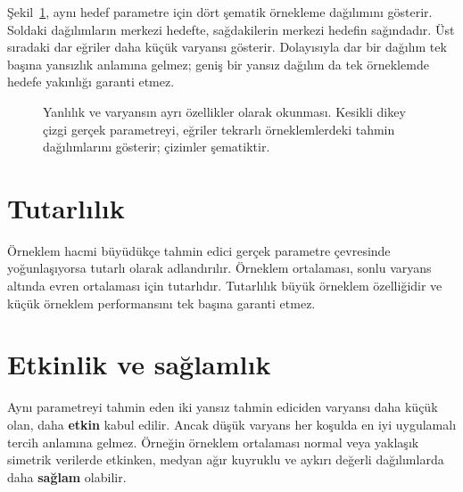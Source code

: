 Şekil~\ref{fig:estimator-bias-spread}, aynı hedef parametre için dört
şematik örnekleme dağılımını gösterir. Soldaki dağılımların merkezi hedefte,
sağdakilerin merkezi hedefin sağındadır. Üst sıradaki dar eğriler daha küçük
varyansı gösterir. Dolayısıyla dar bir dağılım tek başına yansızlık anlamına
gelmez; geniş bir yansız dağılım da tek örneklemde hedefe yakınlığı garanti etmez.

\begin{figure}[H]
\centering
{}
\caption{Yanlılık ve varyansın ayrı özellikler olarak okunması. Kesikli
dikey çizgi gerçek parametreyi, eğriler tekrarlı örneklemlerdeki tahmin
dağılımlarını gösterir; çizimler şematiktir.}
\label{fig:estimator-bias-spread}
\end{figure}

\section{Tutarlılık}

Örneklem hacmi büyüdükçe tahmin edici gerçek parametre çevresinde yoğunlaşıyorsa
tutarlı olarak adlandırılır. Örneklem ortalaması, sonlu varyans altında evren
ortalaması için tutarlıdır. Tutarlılık büyük örneklem özelliğidir ve küçük
örneklem performansını tek başına garanti etmez.

\section{Etkinlik ve sağlamlık}

Aynı parametreyi tahmin eden iki yansız tahmin ediciden varyansı daha küçük
olan, daha \textbf{etkin} kabul edilir. Ancak düşük varyans her koşulda en iyi
uygulamalı tercih anlamına gelmez. Örneğin örneklem ortalaması normal veya
yaklaşık simetrik verilerde etkinken, medyan ağır kuyruklu ve aykırı değerli
dağılımlarda daha \textbf{sağlam} olabilir.

